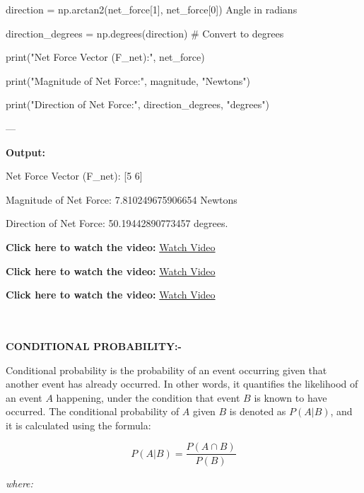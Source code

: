 \documentclass{report}
\begin{document}
direction = np.arctan2(net_force[1], net_force[0])  Angle in radians \ 

direction_degrees = np.degrees(direction)  # Convert to degrees \  


print("Net Force Vector (F_net):", net_force)

print("Magnitude of Net Force:", magnitude, "Newtons")

print("Direction of Net Force:", direction_degrees, "degrees") 


\setlength{\parskip}{1em}


---
\ 
 \ 
  \

   
\textbf{Output:}




Net Force Vector (F_net): [5 6]

Magnitude of Net Force: 7.810249675906654 Newtons

Direction of Net Force: 50.19442890773457 degrees. 




\textbf{Click here to watch the video: }\href{https://drive.google.com/file/d/1VlTeJLOTASAtO9nbkH_QxsGp8jWv7EO0/view?usp=drive_link}{Watch Video}

\textbf{Click here to watch the video: }\href{https://drive.google.com/file/d/1Rbj_JCdAgs84ctgMNpFsYSufM_-e7lto/view?usp=drive_link}{Watch Video} 


\textbf{Click here to watch the video: }\href{https://drive.google.com/file/d/10KBo4J0sRjEIQccBlL08HJFJY9zLl3Rw/view?usp=drive_link}{Watch Video} 





\setlength{\parskip}{1em}
\ 
 \ 
 \ 
 \  
 \ 
   \ 
   \ 
   \ 
\paragraph{   }
   \textbf{CONDITIONAL PROBABILITY:-}



Conditional probability is the probability of an event occurring given that another event has already occurred. In other words, it quantifies the likelihood of an event \( A \) happening, under the condition that event \( B \) is known to have occurred. The conditional probability of \( A \) given \( B \) is denoted as \( P(A | B) \), and it is calculated using the formula:


\[
P(A | B) = \frac{P(A \cap B)}{P(B)}
\]

\textit{where:}
\end{document}
